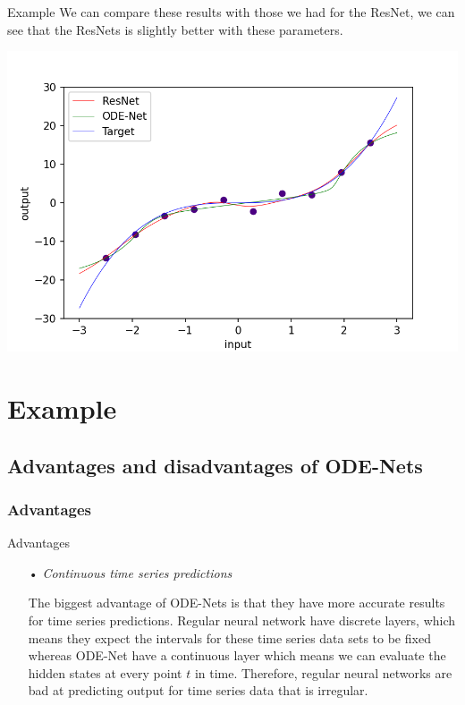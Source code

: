 \documentclass[11pt]{beamer}
\begin{document}
\begin{frame}{Example}
We can compare these results with those we had for the ResNet, we can see that the ResNets is slightly better with these parameters.
\begin{center}
\includegraphics[scale=0.45]{comparaison.png}
\end{center}
\end{frame}

\section{Example}
\begin{frame}

\end{frame}

\subsection{Advantages and disadvantages of ODE-Nets}
\subsubsection*{Advantages}

\begin{frame}{Advantages}
\begin{itemize}
\item[•] \textit{Continuous time series predictions}

The biggest advantage of ODE-Nets is that they have more accurate results for time series predictions. Regular neural network have discrete layers, which means they expect the intervals for these time series data sets to be fixed whereas ODE-Net have a continuous layer which means we can evaluate the hidden states at every point $t$ in time. Therefore, regular neural networks are bad at predicting output for time series data that is irregular.
\end{itemize}
\end{frame}
\end{document}
